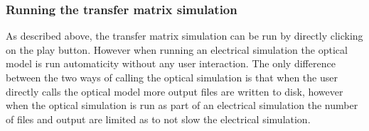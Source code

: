 \subsubsection{Running the transfer matrix simulation}
As described above, the transfer matrix simulation can be run by directly clicking on the play button.  However when running an electrical simulation the optical model is run automaticity without any user interaction. The only difference between the two ways of calling the optical simulation is that when the user directly calls the optical model more output files are written to disk, however when the optical simulation is run as part of an electrical simulation the number of files and output are limited as to not slow the electrical simulation. 
\newpage




